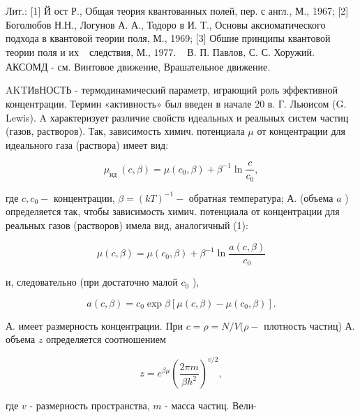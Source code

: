 \documentclass[10pt]{article}
\begin{document}
Лит.: [1] Й ост Р., Общая теория квантованных полей, пер. с англ., М., 1967; [2] Боголюбов Н.Н., Логунов А. А., Тодоро в И. Т., Основы аксиоматического подхода в квантовой теории поля, М., 1969; [3] Обшие принципы квантовой теории поля и их $\begin{array}{ll}\text { следствия, М., } 1977 . & \text { В. П. Павлов, С. С. Хоружий. }\end{array}$ АКСОМД - см. Винтовое движение, Врашательное движение.



AKTИвНОСТЬ - термодинамический параметр, играющий роль эффективной концентрации. Термин «активность» был введен в начале 20 в. Г. Льюисом (G. Lewis). A характеризует различие свойств идеальных и реальных систем частиц (газов, растворов). Так, зависимость химич. потенциала $\mu$ от концентрации для идеального газа (раствора) имеет вид:



\[

\mu_{\text {ид }}(c, \beta)=\mu\left(c_{0}, \beta\right)+\beta^{-1} \ln \frac{c}{c_{0}},

\]



где $c, c_{0}-$ концентрации, $\beta=(k T)^{-1}-$ обратная температура; А. (объема $a$ ) определяется так, чтобы зависимость химич. потенциала от концентрации для реальных газов (растворов) имела вид, аналогичный (1):



\[

\mu(c, \beta)=\mu\left(c_{0}, \beta\right)+\beta^{-1} \ln \frac{a(c, \beta)}{c_{0}}

\]



и, следовательно (при достаточно малой $c_{0}$ ),



\[

a(c, \beta)=c_{0} \exp \beta\left[\mu(c, \beta)-\mu\left(c_{0}, \beta\right)\right] .

\]



А. имеет размерность концентрации. При $c=\rho=N / V(\rho-$ плотность частиц) А. объема $z$ определяется соотношением



\[

z=e^{\beta \mu}\left(\frac{2 \pi m}{\beta h^{2}}\right)^{v / 2},

\]



где $v$ - размерность пространства, $m$ - масса частиц. Вели-
\end{document}

